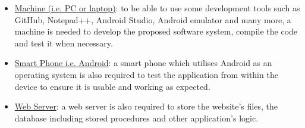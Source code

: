 \documentclass{article}
\begin{document}
\begin{itemize}
\item \underline{Machine (i.e. PC or laptop)}: to be able to use some development tools such as GitHub, Notepad++, Android Studio, Android emulator and many more, a machine is needed to develop the proposed software system, compile the code and test it when necessary. 
\item \underline{Smart Phone i.e. Android}: a smart phone which utilises Android as an operating system is also required to test the application from within the device to ensure it is usable and working as expected. 
\item \underline{Web Server}: a web server is also required to store the website’s files, the database including stored procedures and other application’s logic.
\end{itemize}
\end{document}

